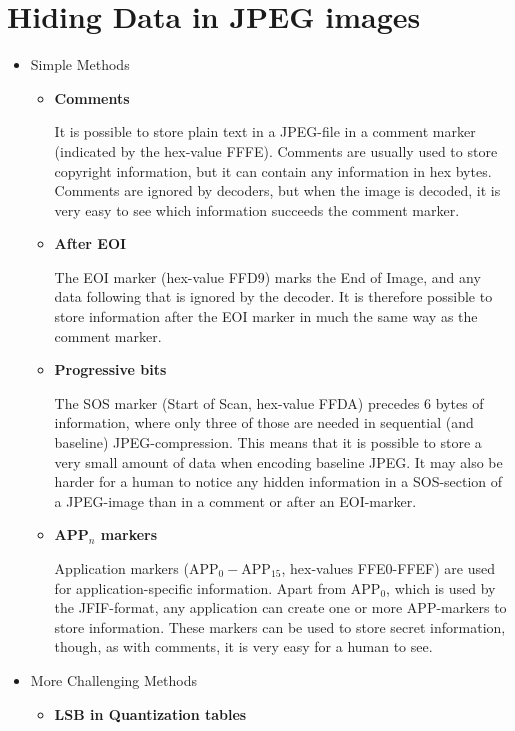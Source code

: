 
\section{Hiding Data in JPEG images}

\begin{itemize}
	\item Simple Methods
	\begin{itemize}
		\item \textbf{Comments}
		
		It is possible to store plain text in a JPEG-file in a comment marker (indicated by the hex-value FFFE).
		Comments are usually used to store copyright information, but it can contain any information in hex bytes.
		Comments are ignored by decoders, but when the image is decoded, it is very easy to see which information succeeds the comment marker.

		\item \textbf{After EOI}
		
		The EOI marker (hex-value FFD9) marks the End of Image, and any data following that is ignored by the decoder.
		It is therefore possible to store information after the EOI marker in much the same way as the comment marker.

		\item \textbf{Progressive bits}
		
		The SOS marker (Start of Scan, hex-value FFDA) precedes 6 bytes of information, where only three of those are needed in sequential (and baseline) JPEG-compression.
		This means that it is possible to store a very small amount of data when encoding baseline JPEG.
		It may also be harder for a human to notice any hidden information in a SOS-section of a JPEG-image than in a comment or after an EOI-marker.

		\item \textbf{APP$_n$ markers}
		
		Application markers (APP$_0-$APP$_{15}$, hex-values FFE0-FFEF) are used for application-specific information.
		Apart from APP$_0$, which is used by the JFIF-format, any application can create one or more APP-markers to store information.
		These markers can be used to store secret information, though, as with comments, it is very easy for a human to see.
	\end{itemize}
	\item More Challenging Methods
	\begin{itemize}
		\item \textbf{LSB in Quantization tables}


\end{itemize}
\end{itemize}

